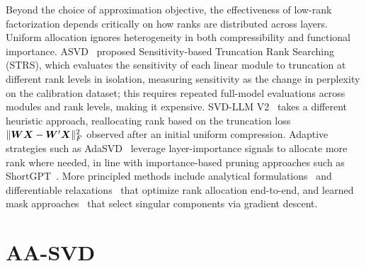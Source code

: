 \documentclass[10pt]{article} %
\theoremstyle{definition}
\theoremstyle{remark}
\newcommand{\ourmethodlight}{{\textsc{AA-SVD}}}
\begin{document}
Beyond the choice of approximation objective, the effectiveness of low-rank
factorization depends critically on how ranks are distributed across layers.
Uniform allocation ignores heterogeneity in both compressibility and functional
importance. ASVD~\citep{yuan2023asvd} proposed Sensitivity-based Truncation Rank
Searching (STRS), which evaluates the sensitivity of each linear module to truncation
at different rank levels in isolation, measuring sensitivity as the change in
perplexity on the calibration dataset; this requires repeated full-model evaluations
across modules and rank levels, making it expensive.
SVD-LLM V2~\citep{wang2025svdllmv2} takes a different heuristic approach,
reallocating rank based on the truncation loss \(\|{\bm{W}}{\bm{X}} - {\bm{W}}'{\bm{X}}\|_F^2\) observed
after an initial uniform compression. Adaptive strategies
such as AdaSVD~\citep{Li2025AdaSVD} leverage layer-importance signals to allocate
more rank where needed, in line with importance-based pruning approaches such as
ShortGPT~\citep{men2024shortgpt}. More principled methods include analytical formulations~\citep{solgi2025activation, abbasi2026zero} and differentiable relaxations~\citep{rausch2025globally, Wang2025DobiSVD} that optimize rank allocation end-to-end, and learned mask approaches~\citep{gao2024adaptive, sundrani2025low, xv2025ara} that select singular components via gradient descent.


\section{\ourmethodlight}
\label{sec:method}
\end{document}
